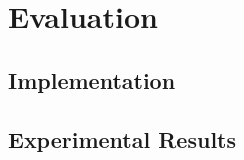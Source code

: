\section{Evaluation} \label{sect:evaluation}

\subsection{Implementation} \label{sect:implementation}


\subsection{Experimental Results} \label{sect:experiments}